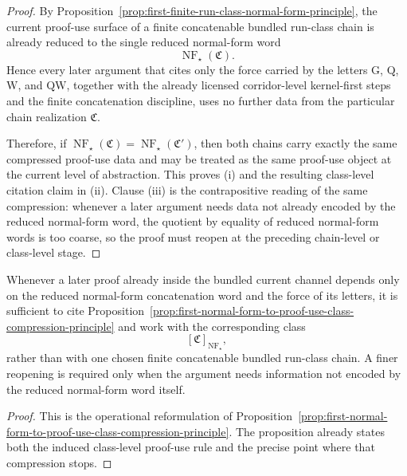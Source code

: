 \begin{proof}
By Proposition~\ref{prop:first-finite-run-class-normal-form-principle}, the current proof-use surface of a finite concatenable bundled run-class chain is already reduced to the single reduced normal-form word
\[
\operatorname{NF}_{\star}(\mathfrak C).
\]
Hence every later argument that cites only the force carried by the letters \(\mathrm G\), \(\mathrm Q\), \(\mathrm W\), and \(\mathrm{QW}\), together with the already licensed corridor-level kernel-first steps and the finite concatenation discipline, uses no further data from the particular chain realization \(\mathfrak C\).

Therefore, if \(\operatorname{NF}_{\star}(\mathfrak C)=\operatorname{NF}_{\star}(\mathfrak C')\), then both chains carry exactly the same compressed proof-use data and may be treated as the same proof-use object at the current level of abstraction. This proves (i) and the resulting class-level citation claim in (ii). Clause (iii) is the contrapositive reading of the same compression: whenever a later argument needs data not already encoded by the reduced normal-form word, the quotient by equality of reduced normal-form words is too coarse, so the proof must reopen at the preceding chain-level or class-level stage.
\end{proof}

\begin{corollary}
\label{cor:use-rule-for-the-first-normal-form-to-proof-use-class-compression-principle}
Whenever a later proof already inside the bundled current channel depends only on the reduced normal-form concatenation word and the force of its letters, it is sufficient to cite Proposition~\ref{prop:first-normal-form-to-proof-use-class-compression-principle} and work with the corresponding class
\[
[\mathfrak C]_{\operatorname{NF}_{\star}},
\]
rather than with one chosen finite concatenable bundled run-class chain. A finer reopening is required only when the argument needs information not encoded by the reduced normal-form word itself.
\end{corollary}

\begin{proof}
This is the operational reformulation of Proposition~\ref{prop:first-normal-form-to-proof-use-class-compression-principle}. The proposition already states both the induced class-level proof-use rule and the precise point where that compression stops.
\end{proof}



